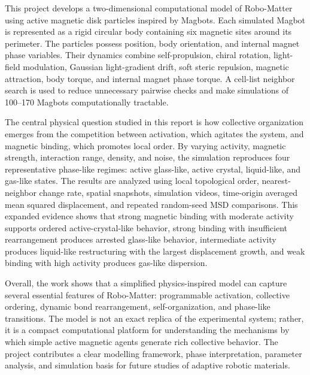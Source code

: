 \documentclass[12pt,a4paper,oneside]{report}
\begin{document}
This project develops a two-dimensional computational model of Robo-Matter using active magnetic disk particles inspired by Magbots. Each simulated Magbot is represented as a rigid circular body containing six magnetic sites around its perimeter. The particles possess position, body orientation, and internal magnet phase variables. Their dynamics combine self-propulsion, chiral rotation, light-field modulation, Gaussian light-gradient drift, soft steric repulsion, magnetic attraction, body torque, and internal magnet phase torque. A cell-list neighbor search is used to reduce unnecessary pairwise checks and make simulations of 100--170 Magbots computationally tractable.

The central physical question studied in this report is how collective organization emerges from the competition between activation, which agitates the system, and magnetic binding, which promotes local order. By varying activity, magnetic strength, interaction range, density, and noise, the simulation reproduces four representative phase-like regimes: active glass-like, active crystal, liquid-like, and gas-like states. The results are analyzed using local topological order, nearest-neighbor change rate, spatial snapshots, simulation videos, time-origin averaged mean squared displacement, and repeated random-seed MSD comparisons. This expanded evidence shows that strong magnetic binding with moderate activity supports ordered active-crystal-like behavior, strong binding with insufficient rearrangement produces arrested glass-like behavior, intermediate activity produces liquid-like restructuring with the largest displacement growth, and weak binding with high activity produces gas-like dispersion.

Overall, the work shows that a simplified physics-inspired model can capture several essential features of Robo-Matter: programmable activation, collective ordering, dynamic bond rearrangement, self-organization, and phase-like transitions. The model is not an exact replica of the experimental system; rather, it is a compact computational platform for understanding the mechanisms by which simple active magnetic agents generate rich collective behavior. The project contributes a clear modelling framework, phase interpretation, parameter analysis, and simulation basis for future studies of adaptive robotic materials.

\clearpage
\tableofcontents
\clearpage
\listoffigures
\clearpage
\listoftables
\clearpage

\end{document}
